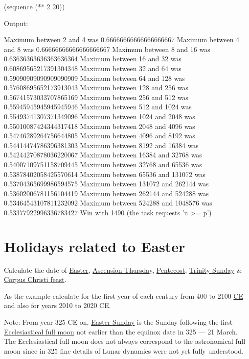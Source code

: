 \begin{itemize}
\begin{wideverbatim}
(sequence (** 2 20))

Output:

Maximum between 2 and 4 was 0.66666666666666666667
Maximum between 4 and 8 was 0.66666666666666666667
Maximum between 8 and 16 was 0.63636363636363636364
Maximum between 16 and 32 was 0.60869565217391304348
Maximum between 32 and 64 was 0.59090909090909090909
Maximum between 64 and 128 was 0.57608695652173913043
Maximum between 128 and 256 was 0.56741573033707865169
Maximum between 256 and 512 was 0.55945945945945945946
Maximum between 512 and 1024 was 0.55493741307371349096
Maximum between 1024 and 2048 was 0.55010087424344317418
Maximum between 2048 and 4096 was 0.54746289264756644805
Maximum between 4096 and 8192 was 0.54414474786396381303
Maximum between 8192 and 16384 was 0.54244270878036220067
Maximum between 16384 and 32768 was 0.54007109751158709445
Maximum between 32768 and 65536 was 0.53878402058425570614
Maximum between 65536 and 131072 was 0.53704365699986594575
Maximum between 131072 and 262144 was 0.53602006781156104419
Maximum between 262144 and 524288 was 0.53464543107811232092
Maximum between 524288 and 1048576 was 0.53377922996336783427
Win with 1490 (the task requests 'n >= p')

\end{wideverbatim}

\pagebreak{}
\section*{Holidays related to Easter}

Calculate the date of
\href{http://en.wikipedia.org/wiki/Easter}{Easter},
\href{http://en.wikipedia.org/wiki/Ascension\_Thursday}{Ascension
Thursday}, \href{http://en.wikipedia.org/wiki/Pentecost}{Pentecost},
\href{http://en.wikipedia.org/wiki/Trinity\_Sunday}{Trinity Sunday} \&
\href{http://en.wikipedia.org/wiki/Corpus\_Christi\_(feast)}{Corpus
Christi feast}.

As the example calculate for the first year of each century from 400 to
2100 \href{http://en.wikipedia.org/wiki/Common\_Era}{CE} and also for
years 2010 to 2020 CE.

Note: From year 325 CE on,
\href{http://en.wikipedia.org/wiki/Easter\_Sunday}{Easter Sunday} is the
Sunday following the ﬁrst
\href{http://en.wikipedia.org/wiki/Ecclesiastical\_full\_moon}{Ecclesiastical
full moon} not earlier than the equinox date in 325 --- 21 March. The
Ecclesiastical full moon does not always correspond to the astronomical
full moon since in 325 ﬁne details of Lunar dynamics were not yet fully
understood.


\end{itemize}
